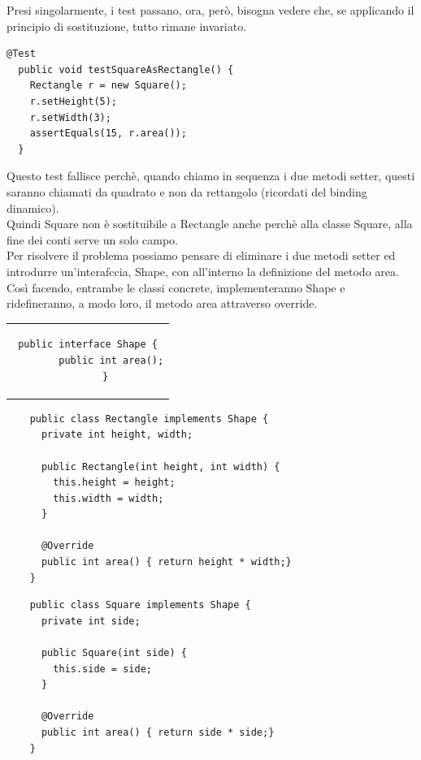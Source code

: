 Presi singolarmente, i test passano, ora, però, bisogna vedere che, se applicando il principio di sostituzione, tutto rimane invariato.\\
\begin{lstlisting}[linewidth=8cm]
  @Test
  public void testSquareAsRectangle() {
    Rectangle r = new Square();
    r.setHeight(5);
    r.setWidth(3);
    assertEquals(15, r.area());
  }
\end{lstlisting}

Questo test fallisce perchè, quando chiamo in sequenza i due metodi setter, questi saranno chiamati da quadrato e non da rettangolo (ricordati del binding dinamico).\\
Quindi Square non è sostituibile a Rectangle anche perchè alla classe Square, alla fine dei conti serve un solo campo.\\
Per risolvere il problema possiamo pensare di eliminare i due metodi setter ed introdurre un'interafccia, Shape, con all'interno la definizione del metodo area.\\
Così facendo, entrambe le classi concrete, implementeranno Shape e ridefineranno, a modo loro, il metodo area attraverso override.

\begin{center}
  \begin{tabular}{c}
    \begin{lstlisting}[linewidth=5cm]
      public interface Shape {
        public int area();
      }
  \end{lstlisting}
  \end{tabular}
\end{center}

\begin{multicols}{2}
  \begin{lstlisting}
    public class Rectangle implements Shape {
      private int height, width;
      
      public Rectangle(int height, int width) {
        this.height = height;
        this.width = width;
      }

      @Override
      public int area() { return height * width;}
    }
  \end{lstlisting}
  \columnbreak
  \begin{lstlisting}
    public class Square implements Shape {
      private int side;
      
      public Square(int side) {
        this.side = side;
      }
      
      @Override
      public int area() { return side * side;}
    }
  \end{lstlisting}
\end{multicols}

